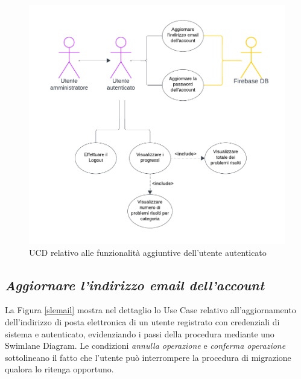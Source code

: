 \documentclass[11pt, a4paper]{article}
\theoremstyle{definition} %
\begin{document}
\begin{figure}[H]
\centering
\hspace*{-1.4cm}
\includegraphics[scale = 0.8]{materiale/ucdiagrams/ucaccount.pdf}
\caption{UCD relativo alle funzionalità aggiuntive dell'utente autenticato}
\end{figure}



\newpage
\subsection*{\textit{Aggiornare l'indirizzo email dell'account}}
La Figura \ref{slemail} mostra nel dettaglio lo Use Case relativo all'aggiornamento
dell'indirizzo di posta elettronica di un utente registrato con credenziali di sistema
e autenticato, evidenziando i passi della procedura mediante uno Swimlane Diagram.
Le condizioni \textit{annulla operazione} e \textit{conferma operazione}
sottolineano il fatto che l'utente può interrompere la procedura di migrazione
qualora lo ritenga opportuno.
\end{document}
